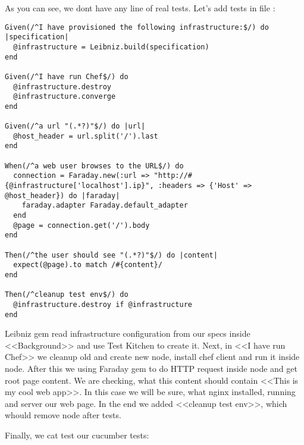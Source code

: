 As you can see, we dont have any line of real tests. Let's add tests in file :

\begin{lstlisting}[label=lst:testing-cucumber-spec6]
Given(/^I have provisioned the following infrastructure:$/) do |specification|
  @infrastructure = Leibniz.build(specification)
end

Given(/^I have run Chef$/) do
  @infrastructure.destroy
  @infrastructure.converge
end

Given(/^a url "(.*?)"$/) do |url|
  @host_header = url.split('/').last
end

When(/^a web user browses to the URL$/) do
  connection = Faraday.new(:url => "http://#{@infrastructure['localhost'].ip}", :headers => {'Host' => @host_header}) do |faraday|
    faraday.adapter Faraday.default_adapter
  end
  @page = connection.get('/').body
end

Then(/^the user should see "(.*?)"$/) do |content|
  expect(@page).to match /#{content}/
end

Then(/^cleanup test env$/) do
  @infrastructure.destroy if @infrastructure
end
\end{lstlisting}

Leibniz gem read infrastructure configuration from our specs inside <<Background>> and use Test Kitchen to create it. Next, in <<I have run Chef>> we cleanup old and create new node, install chef client and run it inside node. After this we using Faraday gem to do HTTP request inside node and get root page content. We are checking, what this content should contain <<This is my cool web app>>. In this case we will be sure, what nginx installed, running and server our web page. In the end we added <<cleanup test env>>, which whould remove node after tests.

Finally, we cat test our cucumber tests:

